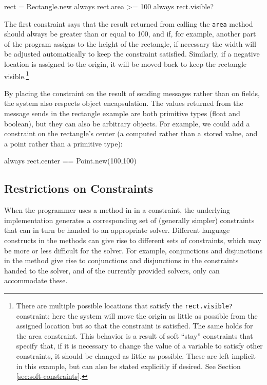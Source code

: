 \begin{code}
rect = Rectangle.new
always { rect.area >= 100 }
always { rect.visible? }
\end{code}

The first constraint says that the result returned from calling the
\lstinline{area} method should always be greater than or equal to 100,
and if, for example, another part of the program assigns to the height
of the rectangle, if necessary the width will be adjusted
automatically to keep the constraint satisfied.  Similarly, if a
negative location is assigned to the origin, it will be moved back to
keep the rectangle visible.\footnote{There are multiple possible
  locations that satisfy the \lstinline{rect.visible?} constraint;
  here the system will move the origin as little as possible from the
  assigned location but so that the constraint is satisfied.  The same
  holds for the area constraint.  This behavior is a result of soft
  ``stay'' constraints that specify that, if it is necessary to change
  the value of a variable to satisfy other constraints, it should be
  changed as little as possible.  These are left implicit in this
  example, but can also be stated explicitly if desired.  See Section
  \ref{sec:soft-constraints}.}

By placing the constraint on the result of sending messages rather
than on fields, the system also respects object encapsulation.  The
values returned from the message sends in the rectangle example are
both primitive types (float and boolean), but they can also be
arbitrary objects.  For example, we could add a constraint on the
rectangle's center (a computed rather than a stored value, and a point
rather than a primitive type):

\begin{code}
always { rect.center == Point.new(100,100) }
\end{code}

\subsection{Restrictions on Constraints}
\label{sec:constraint-restrictions}

When the programmer uses a method in \langname in a constraint, the
underlying implementation generates a corresponding set of (generally
simpler) constraints that can in turn be handed to an appropriate
solver.  Different language constructs in the methods can give rise to
different sets of constraints, which may be more or less difficult for
the solver.  For example, conjunctions and disjunctions in the method
give rise to conjunctions and disjunctions in the constraints handed
to the solver, and of the currently provided solvers, only \zthree
can accommodate these.

